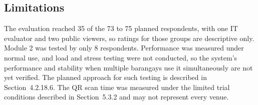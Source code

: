\subsection{Limitations}
\label{subsec:limitations}

\hspace*{\parindent}The evaluation reached 35 of the 73 to 75 planned respondents, with one IT evaluator and two public viewers, so ratings for those groups are descriptive only. Module 2 was tested by only 8 respondents. Performance was measured under normal use, and load and stress testing were not conducted, so the system's performance and stability when multiple barangays use it simultaneously are not yet verified. The planned approach for such testing is described in Section~4.2.18.6. The QR scan time was measured under the limited trial conditions described in Section~5.3.2 and may not represent every venue.
\vspace{5mm}